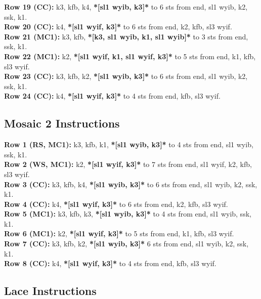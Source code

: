 \documentclass[12pt]{article}
\newcommand{\rowDir}[1]{\textbf{#1:}} %
\renewcommand{\repeat}[1]{\textbf{*[#1]*}} %
\begin{document}
\rowDir{Row 19 (CC)} k3, kfb, k4, \repeat{sl1 wyib, k3} to 6 sts from end, sl1 wyib, k2, ssk, k1. \\
\rowDir{Row 20 (CC)} k4, \repeat{sl1 wyif, k3} to 6 sts from end, k2, kfb, sl3 wyif. \\
\rowDir{Row 21 (MC1)} k3, kfb, \repeat{k3, sl1 wyib, k1, sl1 wyib} to 3 sts from end, ssk, k1. \\
\rowDir{Row 22 (MC1)} k2, \repeat{sl1 wyif, k1, sl1 wyif, k3} to 5 sts from end, k1, kfb, sl3 wyif. \\
\rowDir{Row 23 (CC)} k3, kfb, k2, \repeat{sl1 wyib, k3} to 6 sts from end, sl1 wyib, k2, ssk, k1. \\
\rowDir{Row 24 (CC)} k4, \repeat{sl1 wyif, k3} to 4 sts from end, kfb, sl3 wyif.

\subsection*{Mosaic 2 Instructions} %

\rowDir{Row 1 (RS, MC1)} k3, kfb, k1, \repeat{sl1 wyib, k3} to 4 sts from end, sl1 wyib, ssk, k1. \\
\rowDir{Row 2 (WS, MC1)} k2, \repeat{sl1 wyif, k3} to 7 sts from end, sl1 wyif, k2, kfb, sl3 wyif. \\
\rowDir{Row 3 (CC)} k3, kfb, k4, \repeat{sl1 wyib, k3} to 6 sts from end, sl1 wyib, k2, ssk, k1. \\
\rowDir{Row 4 (CC)} k4, \repeat{sl1 wyif, k3} to 6 sts from end, k2, kfb, sl3 wyif. \\
\rowDir{Row 5 (MC1)} k3, kfb, k3, \repeat{sl1 wyib, k3} to 4 sts from end, sl1 wyib, ssk, k1. \\
\rowDir{Row 6 (MC1)} k2, \repeat{sl1 wyif, k3} to 5 sts from end, k1, kfb, sl3 wyif. \\
\rowDir{Row 7 (CC)} k3, kfb, k2, \repeat{sl1 wyib, k3} 6 sts from end, sl1 wyib, k2, ssk, k1. \\
\rowDir{Row 8 (CC)} k4, \repeat{sl1 wyif, k3} to 4 sts from end, kfb, sl3 wyif. 

\newpage
\subsection*{Lace Instructions} %
\end{document}
